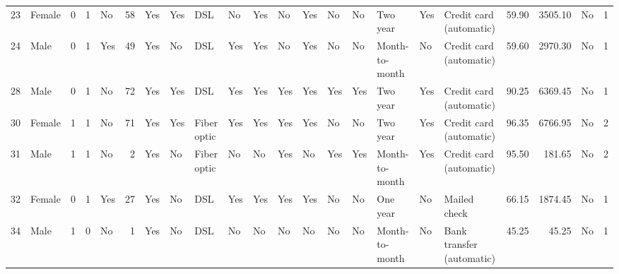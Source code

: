 \documentclass[8pt,onecolumn,aps,pra]{revtex4-1}
\begin{document}
{\begin{tabular}{llrrlrllllllllllllrrlr}
23 &  Female &              0 &        1 &         No &      58 &          Yes &               Yes &             DSL &                   No &                  Yes &                   No &                  Yes &                   No &                   No &        Two year &              Yes &    Credit card (automatic) &           59.90 &       3505.10 &    No &      1 \\
24 &    Male &              0 &        1 &        Yes &      49 &          Yes &                No &             DSL &                  Yes &                  Yes &                   No &                  Yes &                   No &                   No &  Month-to-month &               No &    Credit card (automatic) &           59.60 &       2970.30 &    No &      1 \\
28 &    Male &              0 &        1 &         No &      72 &          Yes &               Yes &             DSL &                  Yes &                  Yes &                  Yes &                  Yes &                  Yes &                  Yes &        Two year &              Yes &    Credit card (automatic) &           90.25 &       6369.45 &    No &      1 \\
30 &  Female &              1 &        1 &         No &      71 &          Yes &               Yes &     Fiber optic &                  Yes &                  Yes &                  Yes &                  Yes &                   No &                   No &        Two year &              Yes &    Credit card (automatic) &           96.35 &       6766.95 &    No &      2 \\
31 &    Male &              1 &        1 &         No &       2 &          Yes &                No &     Fiber optic &                   No &                   No &                  Yes &                   No &                  Yes &                  Yes &  Month-to-month &              Yes &    Credit card (automatic) &           95.50 &        181.65 &    No &      2 \\
32 &  Female &              0 &        1 &        Yes &      27 &          Yes &                No &             DSL &                  Yes &                  Yes &                  Yes &                  Yes &                   No &                   No &        One year &               No &               Mailed check &           66.15 &       1874.45 &    No &      1 \\
34 &    Male &              1 &        0 &         No &       1 &          Yes &                No &             DSL &                   No &                   No &                   No &                   No &                   No &                   No &  Month-to-month &               No &  Bank transfer (automatic) &           45.25 &         45.25 &    No &      1 \\

\end{tabular}}
\end{document}
